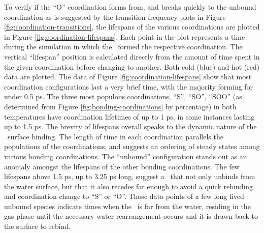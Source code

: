 \documentclass{article}
\begin{document}
To verify if the ``O'' coordination forms from, and breaks quickly to the unbound coordination as is suggested by the transition frequency plots in Figure \ref{fig:coordination-transitions}, the lifespans of the various coordinations are plotted in Figure \ref{fig:coordination-lifespans}. Each point in the plot represents a time during the simulation in which the \suldiox~formed the respective coordination. The vertical ``lifespan'' position is calculated directly from the amount of time spent in the given coordination before changing to another. Both cold (blue) and hot (red) data are plotted. The data of Figure \ref{fig:coordination-lifespans} show that most coordination configurations last a very brief time, with the majority forming for under 0.5 ps. The three most populous coordinations, ``S'', ``SO'', ``SOO'' (as determined from Figure \ref{fig:bonding-coordinations} by percentage) in both temperatures have coordination lifetimes of up to 1 ps, in some instances lasting up to 1.5 ps. The brevity of lifespans overall speaks to the dynamic nature of the \suldiox~surface binding. The length of time in each coordination parallels the populations of the coordinations, and suggests an ordering of steady states among various bonding coordinations. The ``unbound'' configuration stands out as an anomaly amongst the lifespans of the other bonding coordinations. The few lifespans above 1.5 ps, up to 3.25 ps long, suggest a \suldiox~that not only unbinds from the water surface, but that it also recedes far enough to avoid a quick rebinding and coordination change to ``S'' or ``O''. Those data points of a few long lived unbound species indicate times when the \suldiox~is far from the water, residing in the gas phase until the necessary water rearrangement occurs and it is drawn back to the surface to rebind.
\end{document}

